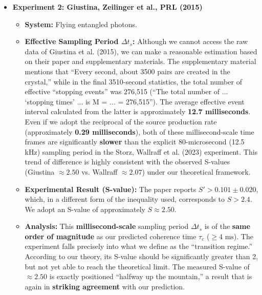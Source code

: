 \documentclass[11pt]{article}
\begin{document}
\begin{itemize}
    \item \textbf{Experiment 2: Giustina, Zeilinger et al., PRL (2015)}
    \begin{itemize}
        \item \textbf{System:} Flying entangled photons.
        \item \textbf{Effective Sampling Period $\Delta t_s$:} Although we cannot access the raw data of Giustina et al. (2015), we can make a reasonable estimation based on their paper and supplementary materials. The supplementary material mentions that ``Every second, about 3500 pairs are created in the crystal,'' while in the final 3510-second statistics, the total number of effective ``stopping events'' was 276,515 (``The total number of ... `stopping times' ... is M = ... = 276,515''). The average effective event interval calculated from the latter is approximately \textbf{12.7 milliseconds}. Even if we adopt the reciprocal of the source production rate (approximately \textbf{0.29 milliseconds}), both of these millisecond-scale time frames are significantly \textbf{slower} than the explicit 80-microsecond (12.5 kHz) sampling period in the Storz, Wallraff et al. (2023) experiment. This trend of difference is highly consistent with the observed S-values (Giustina $\approx2.50$ vs. Wallraff $\approx2.07$) under our theoretical framework.
        \item \textbf{Experimental Result (S-value):} The paper reports $S' > 0.101 \pm 0.020$, which, in a different form of the inequality used, corresponds to $S > 2.4$. We adopt an S-value of approximately \textbf{$S \approx 2.50$}.
        \item \textbf{Analysis:} This \textbf{millisecond-scale} sampling period $\Delta t_s$ is of the \textbf{same order of magnitude} as our predicted coherence time $\tau_c$ ($\geq 4 \text{ ms}$). The experiment falls precisely into what we define as the ``transition regime.'' According to our theory, its S-value should be significantly greater than 2, but not yet able to reach the theoretical limit. The measured S-value of $\approx 2.50$ is exactly positioned ``halfway up the mountain,'' a result that is again in \textbf{striking agreement} with our prediction.
    \end{itemize}
\end{itemize}
\end{document}
